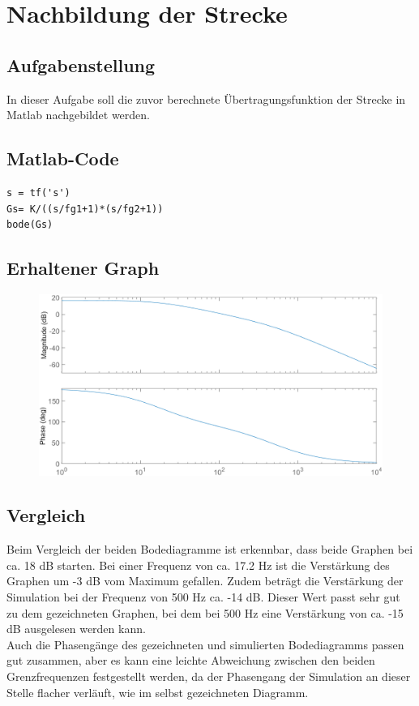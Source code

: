 \documentclass[twoside]{article}
\begin{document}
\newpage
\section{Nachbildung der Strecke}
\subsection{Aufgabenstellung}
In dieser Aufgabe soll die zuvor berechnete Übertragungsfunktion der Strecke in Matlab nachgebildet werden.

\subsection{Matlab-Code}
\begin{verbatim}
s = tf('s')
Gs= K/((s/fg1+1)*(s/fg2+1))
bode(Gs)
\end{verbatim}

\subsection{Erhaltener Graph}
\begin{figure}[h]
    \centering
    \includegraphics[width=1\linewidth]{img/Bode_03.png}
\end{figure}

\subsection{Vergleich}
Beim Vergleich der beiden Bodediagramme ist erkennbar, dass beide Graphen bei ca. 18 dB starten. Bei einer Frequenz von ca. 17.2 Hz ist die Verstärkung des Graphen um -3 dB vom Maximum gefallen. Zudem beträgt die Verstärkung der Simulation bei der Frequenz von 500 Hz ca. -14 dB. Dieser Wert passt sehr gut zu dem gezeichneten Graphen, bei dem bei 500 Hz eine Verstärkung von ca. -15 dB ausgelesen werden kann.\\
Auch die Phasengänge des gezeichneten und simulierten Bodediagramms passen gut zusammen, aber es kann eine leichte Abweichung zwischen den beiden Grenzfrequenzen festgestellt werden, da der Phasengang der Simulation an dieser Stelle flacher verläuft, wie im selbst gezeichneten Diagramm. 
\end{document}
